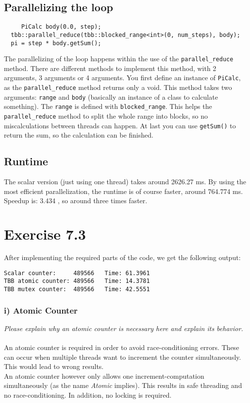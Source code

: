 \documentclass[a4paper]{article}
\begin{document}
\subsection*{Parallelizing the loop}
\begin{lstlisting}
     PiCalc body(0.0, step);
  tbb::parallel_reduce(tbb::blocked_range<int>(0, num_steps), body); 
  pi = step * body.getSum();
\end{lstlisting}
The parallelizing of the loop happens within the use of the \lstinline{parallel_reduce} method. There are different methods to implement this method, with 2 arguments, 3 arguments or 4 arguments.
You first define an instance of \lstinline{PiCalc}, as the \lstinline{parallel_reduce} method returns only a void. This method takes two arguments: \lstinline{range} and \lstinline{body} (basically an instance of a class to calculate something). The \lstinline{range} is defined with \lstinline{blocked_range}. This helps the \lstinline{parallel_reduce} method to split the whole range into blocks, so no miscalculations between threads can happen. At last you can use \lstinline{getSum()} to return the sum, so the calculation can be finished.

\subsection*{Runtime}
The scalar version (just using one thread) takes around 2626.27 ms. By using the most efficient parallelization, the runtime is of course faster, around 764.774 ms. Speedup is: 3.434 , so around three times faster.

\clearpage
\section*{Exercise 7.3}
After implementing the required parts of the code, we get the following output:
\begin{lstlisting}
Scalar counter:     489566 	 Time: 61.3961
TBB atomic counter: 489566 	 Time: 14.3781
TBB mutex counter:  489566 	 Time: 42.5551
\end{lstlisting}
\subsubsection*{i) Atomic Counter}
\textit{Please explain why an atomic counter is necessary here and explain its behavior.}\\\\
An atomic counter is required in order to avoid race-conditioning errors. These can occur when multiple threads want to increment the counter simultaneously. This would lead to wrong results.\\
An atomic counter however only allows one increment-computation simultaneously (as the name \textit{Atomic} implies). This results in safe threading and no race-conditioning. In addition, no locking is required.
\end{document}
